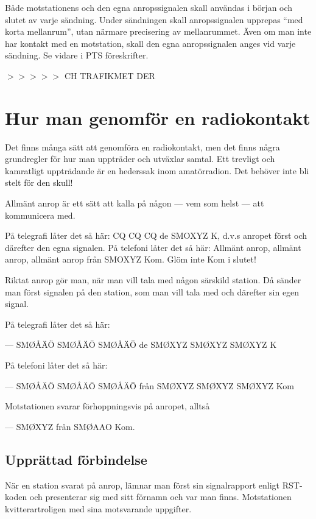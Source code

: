 Både motstationens och den egna anropssignalen skall användas i början
och slutet av varje sändning.  Under sändningen skall anropssignalen
upprepas ``med korta mellanrum'', utan närmare precisering av
mellanrummet.  Även om man inte har kontakt med en motstation, skall
den egna anropssignalen anges vid varje sändning.  Se vidare i PTS
föreskrifter.

$>>>>>$ CH TRAFIKMET DER


\section{Hur man genomför en radiokontakt}

Det finns många sätt att genomföra en radiokontakt, men det finns
några grundregler för hur man uppträder och utväxlar samtal. Ett
trevligt och kamratligt uppträdande är en hederssak inom
amatörradion. Det behöver inte bli stelt för den skull!

Allmänt anrop är ett sätt att kalla på någon
--- vem som helst --- att kommunicera med.

På telegrafi låter det så här: CQ CQ CQ de SMOXYZ K, d.v.s anropet
först och därefter den egna signalen.  På telefoni låter det så här:
Allmänt anrop, allmänt anrop, allmänt anrop från SMOXYZ Kom. Glöm inte
Kom i slutet!

Riktat anrop gör man, när man vill tala med någon särskild station. Då
sänder man först signalen på den station, som man vill tala med och
därefter sin egen signal.

På telegrafi låter det så här:

--- SMØÅÄÖ SMØÅÄÖ SMØÅÄÖ de SMØXYZ SMØXYZ SMØXYZ K

På telefoni låter det så här:

--- SMØÅÄÖ SMØÅÄÖ SMØÅÄÖ från SMØXYZ SMØXYZ SMØXYZ Kom

Motstationen svarar förhoppningsvis på anropet, alltså

--- SMØXYZ från SMØAAO Kom.

\subsection{Upprättad förbindelse}

När en station svarat på anrop, lämnar man först sin signalrapport
enligt RST-koden och presenterar sig med sitt förnamn och var man
finns. Motstationen kvitterartroligen med sina motsvarande
uppgifter.

